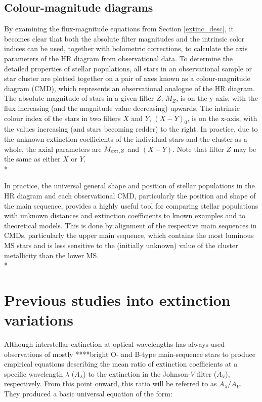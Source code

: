 \documentclass[12pt, a4paper]{report}
\begin{document}
\section{Colour-magnitude diagrams}

By examining the flux-magnitude equations from Section \ref{extinc_desc}, it becomes clear that both the absolute filter magnitudes and the intrinsic color indices can be used, together with bolometric corrections, to calculate the axis parameters of the HR diagram from observational data. To determine the detailed properties of stellar populations, all stars in an observational sample or star cluster are plotted together on a pair of axes known as a colour-magnitude diagram (CMD), which represents an observational analogue of the HR diagram. The absolute magnitude of stars in a given filter $Z$, $M_{Z}$, is on the y-axis, with the flux increasing (and the magnitude value decreasing) upwards. The intrinsic colour index of the stars in two filters $X$ and $Y$, $(X-Y)_{0}$, is on the x-axis, with the values increasing (and stars becoming redder) to the right. In practice, due to the unknown extinction coefficients of the individual stars and the cluster as a whole, the axial parameters  are $M_{\textnormal{ext},Z}$ and $(X-Y)$. Note that filter $Z$ may be the same as either $X$ or $Y$. \\*

In practice, the universal general shape and position of stellar populations in the HR diagram and each observational CMD, particularly the position and shape of the main sequence, provides a highly useful tool for comparing stellar populations with unknown distances and extinction coefficients to known examples and to theoretical models. This is done by alignment of the respective main sequences in CMDs, particularly the upper main sequence, which contains the most luminous MS stars and is less sensitive to the (initially unknown) value of the cluster metallicity than the lower MS. \\*



\chapter{Previous studies into extinction variations}

Although interstellar extinction at optical wavelengths has always
\cite{1989ApJ...345..245C} used observations of mostly ****bright O- and B-type main-sequence stars to produce empirical equations describing the mean ratio of extinction coefficients at a specific wavelength $\lambda$ ($A_{\lambda}$) to the extinction in the Johnson-$V$ filter ($A_{V}$), respectively. From this point onward, this ratio will be referred to as $A_{\lambda}/A_{V}$. They produced a basic universal equation of the form:
\end{document}
